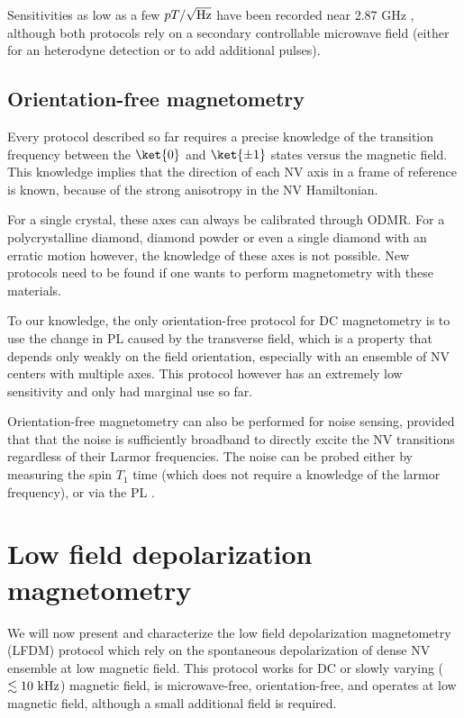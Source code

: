 \documentclass[a4paper,11pt]{report}
\begin{document}
Sensitivities as low as a few $pT/\sqrt{\rm Hz}$ have been recorded near 2.87 GHz \citep{wang2022picotesla, alsid2022solid}, although both protocols rely on a secondary controllable microwave field (either for an heterodyne detection or to add additional pulses).

\subsection{Orientation-free magnetometry}
Every protocol described so far requires a precise knowledge  of the transition frequency between the $\ket{0}$ and $\ket{\pm 1}$ states versus the magnetic field. This knowledge implies that the direction of each NV axis in a frame of reference is known, because of the strong anisotropy in the NV Hamiltonian. 

For a single crystal, these axes can always be calibrated through ODMR. For a polycrystalline diamond, diamond powder or even a single diamond with an erratic motion however, the knowledge of these axes is not possible. New protocols need to be found if one wants to perform magnetometry with these materials.

To our knowledge, the only orientation-free protocol for DC magnetometry is to use the change in PL caused by the transverse field, which is a property that depends only weakly on the field orientation, especially with an ensemble of NV centers with multiple axes. This protocol however has an extremely low sensitivity and only had marginal use so far\citep{rondin2012nanoscale, tetienne2012magnetic}.

Orientation-free magnetometry can also be performed for noise sensing, provided that that the noise is sufficiently broadband to directly excite the NV transitions regardless of their Larmor frequencies. The noise can be probed either by measuring the spin $T_1$ time \citep{kolkowitz2015probing, andersen2019electron} (which does not require a knowledge of the larmor frequency), or via the PL \citep{finco2021imaging}.

\section{Low field depolarization magnetometry}
We will now present and characterize the low field depolarization magnetometry (LFDM) protocol which rely on the spontaneous depolarization of dense NV ensemble at low magnetic field. This protocol works for DC or slowly varying ($\lesssim 10\ \rm kHz$) magnetic field, is microwave-free, orientation-free, and operates at low magnetic field, although a small additional field is required.
\end{document}
